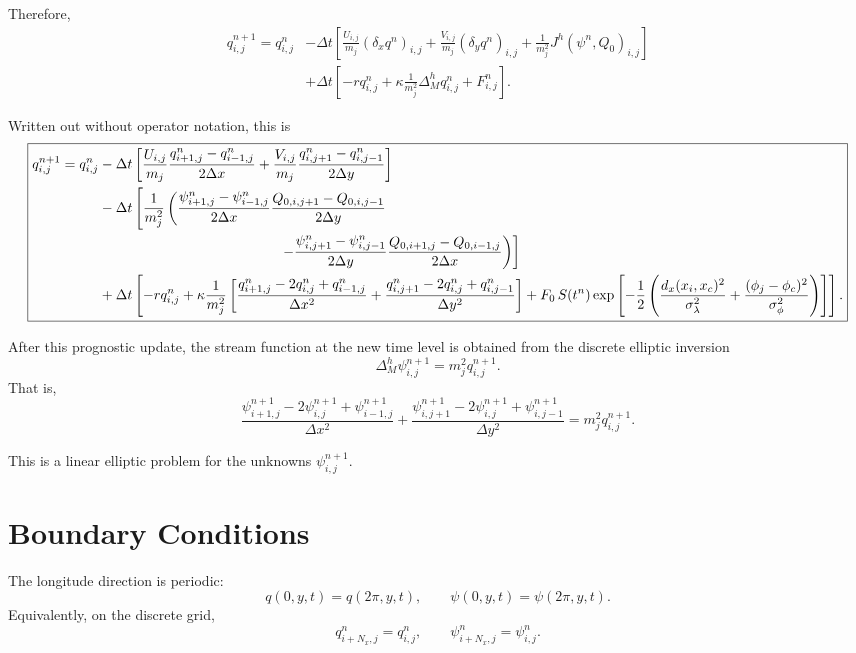 \documentclass[11pt]{article}
\begin{document}
Therefore,
\[
\boxed{
\begin{aligned}
q_{i,j}^{n+1}
=
q_{i,j}^{n}
&-
\Delta t
\left[
\frac{U_{i,j}}{m_j}
(\delta_x q^n)_{i,j}
+
\frac{V_{i,j}}{m_j}
(\delta_y q^n)_{i,j}
+
\frac{1}{m_j^2}
J^h(\psi^n,Q_0)_{i,j}
\right]
\\
&+
\Delta t
\left[
-r q_{i,j}^{n}
+
\kappa
\frac{1}{m_j^2}
\Delta_M^h q_{i,j}^{n}
+
F_{i,j}^{n}
\right].
\end{aligned}
}
\]

Written out without operator notation, this is
\[
\boxed{
\begin{aligned}
q_{i,j}^{n+1}
=
q_{i,j}^{n}
&-
\Delta t
\left[
\frac{U_{i,j}}{m_j}
\frac{q_{i+1,j}^{n}-q_{i-1,j}^{n}}{2\Delta x}
+
\frac{V_{i,j}}{m_j}
\frac{q_{i,j+1}^{n}-q_{i,j-1}^{n}}{2\Delta y}
\right]
\\
&-
\Delta t
\left[
\frac{1}{m_j^2}
\left(
\frac{\psi_{i+1,j}^{n}-\psi_{i-1,j}^{n}}{2\Delta x}
\frac{Q_{0,i,j+1}-Q_{0,i,j-1}}{2\Delta y}
\right.\right.
\\
&\hspace{4.5cm}
\left.\left.
-
\frac{\psi_{i,j+1}^{n}-\psi_{i,j-1}^{n}}{2\Delta y}
\frac{Q_{0,i+1,j}-Q_{0,i-1,j}}{2\Delta x}
\right)
\right]
\\
&+
\Delta t
\left[
-r q_{i,j}^{n}
+
\kappa
\frac{1}{m_j^2}
\left[
\frac{q_{i+1,j}^{n}-2q_{i,j}^{n}+q_{i-1,j}^{n}}{\Delta x^2}
+
\frac{q_{i,j+1}^{n}-2q_{i,j}^{n}+q_{i,j-1}^{n}}{\Delta y^2}
\right]
+
F_0\,S(t^n)
\exp
\left[
-\frac{1}{2}
\left(
\frac{d_x(x_i,x_c)^2}{\sigma_\lambda^2}
+
\frac{(\phi_j-\phi_c)^2}{\sigma_\phi^2}
\right)
\right]
\right].
\end{aligned}
}
\]

After this prognostic update, the stream function at the new time level is obtained
from the discrete elliptic inversion
\[
\boxed{
\Delta_M^h \psi_{i,j}^{n+1}
=
m_j^2 q_{i,j}^{n+1}.
}
\]
That is,
\[
\boxed{
\frac{\psi_{i+1,j}^{n+1}-2\psi_{i,j}^{n+1}+\psi_{i-1,j}^{n+1}}{\Delta x^2}
+
\frac{\psi_{i,j+1}^{n+1}-2\psi_{i,j}^{n+1}+\psi_{i,j-1}^{n+1}}{\Delta y^2}
=
m_j^2 q_{i,j}^{n+1}.
}
\]

This is a linear elliptic problem for the unknowns \(\psi_{i,j}^{n+1}\).

\section{Boundary Conditions}

The longitude direction is periodic:
\[
q(0,y,t)=q(2\pi,y,t),
\qquad
\psi(0,y,t)=\psi(2\pi,y,t).
\]
Equivalently, on the discrete grid,
\[
q_{i+N_x,j}^n=q_{i,j}^n,
\qquad
\psi_{i+N_x,j}^n=\psi_{i,j}^n.
\]
\end{document}
